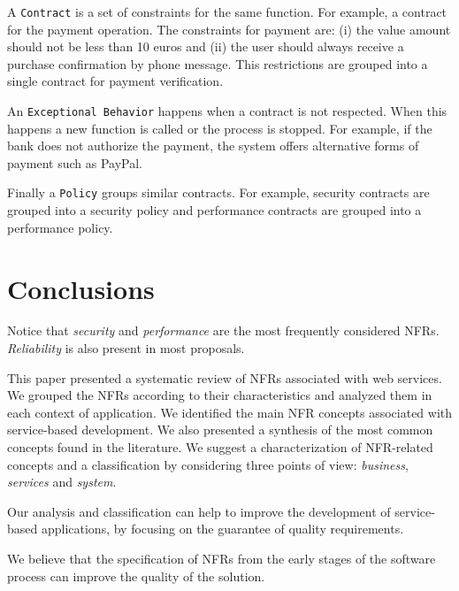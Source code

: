 \documentclass[english,12pt]{article}
\begin{document}
A \texttt{Contract} is a set of constraints for the same function. For example,
a contract for the payment operation. The constraints for payment are: (i) the
value amount should not be less than 10 euros and (ii) the user should always
receive a purchase confirmation by phone message. This restrictions are
grouped into a single contract for payment verification. 

 
An \texttt{Exceptional Behavior} happens when a contract is not respected. When
this happens a new function is called or the process is stopped. For example, if
the bank does not authorize the payment, the system offers alternative forms
of payment such as PayPal.

Finally a \texttt{Policy} groups similar contracts. For example, security
contracts are grouped into a security policy and performance contracts are
grouped into a performance policy.

\section{Conclusions}
\label{sec:conclusion}
 
 
Notice that \textit{security} and \textit{performance} are the most frequently considered NFRs.
\textit{Reliability} is also present in most proposals.

 
 
 

 
 
This paper presented a systematic review of NFRs associated with web services.
We grouped the NFRs according to their characteristics and analyzed them in each
context of application. 
We identified the main NFR concepts associated with service-based development. 
We also presented a synthesis of the most common concepts found in the literature. 
We suggest a characterization of NFR-related concepts and a classification by considering three points of view: \textit{business}, \textit{services} and \textit{system}. 

Our analysis and classification can help to improve the development of
service-based applications, by focusing on the guarantee of quality requirements. 

We believe that the specification of NFRs from the early stages of the software process
can improve the quality of the solution.
   

 
\end{document}
